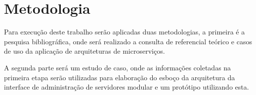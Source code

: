 \section{Metodologia}

  Para execução deste trabalho serão aplicadas duas metodologias, a primeira
  é a pesquisa bibliográfica, onde será realizado a consulta de referencial
  teórico e casos de uso da aplicação de arquiteturas de microserviços.

  A segunda parte será um estudo de caso, onde as informações coletadas
  na primeira etapa serão utilizadas para elaboração do esboço da arquitetura
  da interface de administração de servidores modular e um protótipo utilizando
  esta.
